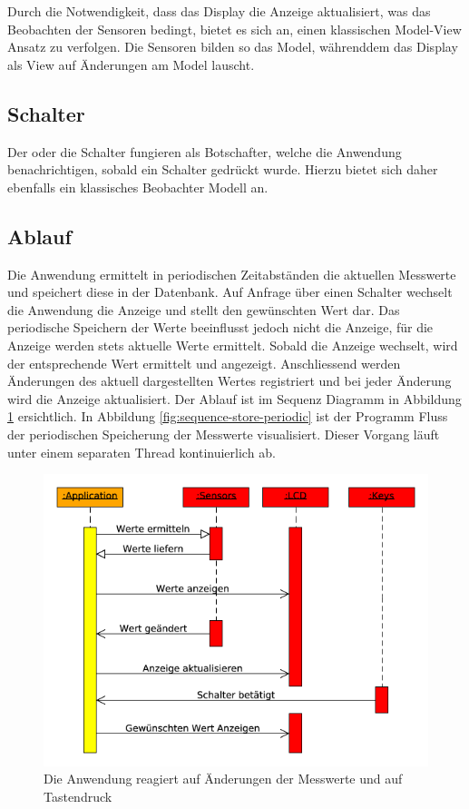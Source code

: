 \documentclass[
    10pt,
    a4paper,
]{scrartcl}
\begin{document}
Durch die Notwendigkeit, dass das Display die Anzeige aktualisiert, was das Beobachten der
Sensoren bedingt, bietet es sich an, einen klassischen Model-View Ansatz zu verfolgen. Die
Sensoren bilden so das Model, währenddem das Display als View auf Änderungen am Model
lauscht.

\subsection{Schalter}
Der oder die Schalter fungieren als Botschafter, welche die Anwendung benachrichtigen,
sobald ein Schalter gedrückt wurde. Hierzu bietet sich daher ebenfalls ein klassisches
Beobachter Modell an.

\subsection{Ablauf}

Die Anwendung ermittelt in periodischen Zeitabständen die aktuellen Messwerte und
speichert diese in der Datenbank. Auf Anfrage über einen Schalter wechselt die Anwendung
die Anzeige und stellt den gewünschten Wert dar. Das periodische Speichern der Werte
beeinflusst jedoch nicht die Anzeige, für die Anzeige werden stets aktuelle Werte
ermittelt. Sobald die Anzeige wechselt, wird der entsprechende Wert ermittelt und
angezeigt. Anschliessend werden Änderungen des aktuell dargestellten Wertes registriert
und bei jeder Änderung wird die Anzeige aktualisiert. Der Ablauf ist im Sequenz Diagramm
in Abbildung \ref{fig:sequence-startup-running} ersichtlich. In Abbildung
\ref{fig:sequence-store-periodic} ist der Programm Fluss der periodischen Speicherung der
Messwerte visualisiert. Dieser Vorgang läuft unter einem separaten Thread kontinuierlich
ab.

\begin{figure}[ht]
    \centering
    \includegraphics[width=.9\textwidth]{sequence-startup-running}
    \caption{Die Anwendung reagiert auf Änderungen der Messwerte und auf Tastendruck}
    \label{fig:sequence-startup-running}
\end{figure}
\end{document}
